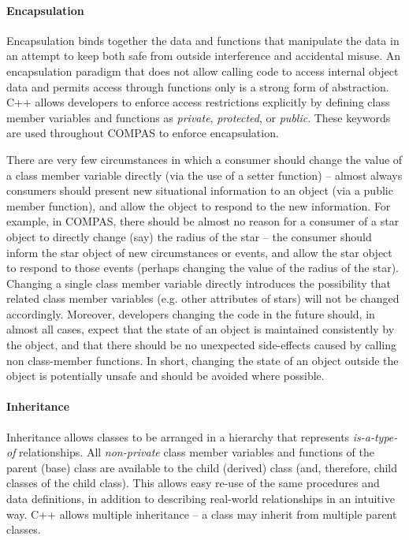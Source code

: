 \paragraph{Encapsulation}\label{sec:Encapsulation}\mbox{}

\medskip
Encapsulation binds together the data and functions that manipulate the data in an attempt to keep both safe from outside interference and accidental misuse. An encapsulation paradigm that does not allow calling code to access internal object data and permits access through functions only is a strong form of abstraction. C++ allows developers to enforce access restrictions explicitly by defining class member variables and functions as \textit{private}, \textit{protected}, or \textit{public}. These keywords are used throughout COMPAS to enforce encapsulation.

There are very few circumstances in which a consumer should change the value of a class member variable directly (via the use of a setter function) -- almost always consumers should present new situational information to an object (via a public member function), and allow the object to respond to the new information. For example, in COMPAS, there should be almost no reason for a consumer of a star object to directly change (say) the radius of the star -- the consumer should inform the star object of new circumstances or events, and allow the star object to respond to those events (perhaps changing the value of the radius of the star). Changing a single class member variable directly introduces the possibility that related class member variables (e.g. other attributes of stars) will not be changed accordingly. Moreover, developers changing the code in the future should, in almost all cases, expect that the state of an object is maintained consistently by the object, and that there should be no unexpected side-effects caused by calling non class-member functions. In short, changing the state of an object outside the object is potentially unsafe and should be avoided where possible.

\paragraph{Inheritance}\label{sec:Inheritance}\mbox{}

\medskip
Inheritance allows classes to be arranged in a hierarchy that represents \textit{is-a-type-of} relationships. All \textit{non-private} class member variables and functions of the parent (base) class are available to the child (derived) class (and, therefore, child classes of the child class). This allows easy re-use of the same procedures and data definitions, in addition to describing real-world relationships in an intuitive way. C++ allows multiple inheritance -- a class may inherit from multiple parent classes.

